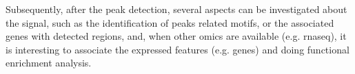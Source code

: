 Subsequently, after the peak detection, several aspects can be investigated about the signal, such as the identification of peaks related motifs, or the associated genes with detected regions, and, when other omics are available (e.g. \gls{rnaseq}), it is interesting to associate the expressed features (e.g. genes) and doing functional enrichment analysis.





